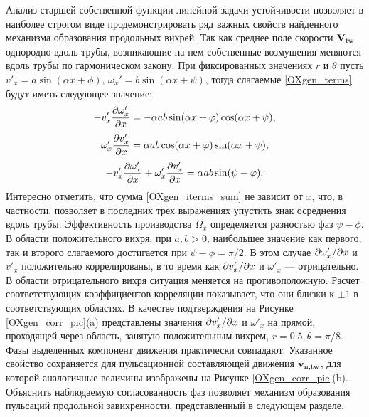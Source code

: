 Анализ старшей собственной функции линейной задачи устойчивости позволяет в наиболее строгом виде продемонстрировать ряд важных свойств найденного механизма образования продольных вихрей. Так как среднее поле скорости $\mathbf{V}_\mathrm{tw}$ однородно вдоль трубы, возникающие на нем собственные возмущения меняются вдоль трубы по гармоническом закону. При фиксированных значениях $r$ и $\theta$ пусть  $v'_x = a \sin(\alpha x + \phi)$, $\omega_x' = b \sin(\alpha x + \psi)$, тогда слагаемые \eqref{OXgen_terms} будут иметь следующее значение:
\begin{equation*} \label{OXgen_iterms_1}
 - v'_x \frac{\partial \omega'_x}{\partial x} = - \alpha a b \sin(\alpha x + \varphi) \cos(\alpha x + \psi),
\end{equation*}
\begin{equation*} \label{OXgen_iterms_2}
\omega'_x \frac{\partial v'_x}{\partial x} =  \alpha a b \cos(\alpha x + \varphi) \sin(\alpha x + \psi),
\end{equation*}
\begin{equation} \label{OXgen_iterms_sum}
 - v'_x \frac{\partial \omega'_x}{\partial x} + \omega'_x \frac{\partial v'_x}{\partial x} = \alpha a b \sin(\psi - \varphi).
\end{equation}
Интересно отметить, что сумма \eqref{OXgen_iterms_sum} не зависит от $x$, что, в частности, позволяет в последних трех выражениях упустить знак осреднения вдоль трубы. Эффективность производства  $\Omega_x$ определяется разностью фаз $\psi - \phi$. В области положительного вихря, при $a,b > 0$, наибольшее значение как первого, так и второго слагаемого достигается при $\psi - \phi = \pi/2$. В этом случае $\partial \omega'_x/\partial x$ и $v'_x$ положительно коррелированы, в то время как $\partial v'_x/\partial x$ и $\omega'_x$ --- отрицательно. В области отрицательного вихря ситуация меняется на противоположную. Расчет соответствующих коэффициентов корреляции показывает, что они близки к $\pm1$ в соответствующих областях. В качестве подтверждения на Рисунке \ref{OXgen_corr_pic}(a) представлены значения $\partial v'_x/\partial x$ и $\omega'_x$ на прямой, проходящей через область, занятую положительным вихрем, $r = 0.5, \theta = \pi/8$. Фазы выделенных компонент движения практически совпадают. Указанное свойство сохраняется для пульсационной составляющей движения $\mathbf{v}_\mathrm{n,tw}$, для которой аналогичные величины изображены на Рисунке \ref{OXgen_corr_pic}(b). Объяснить наблюдаемую согласованность фаз позволяет механизм образования пульсаций продольной завихренности, представленный в следующем разделе. 


